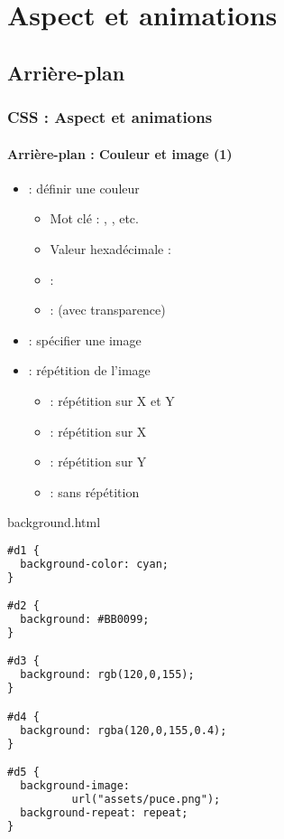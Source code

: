 \documentclass[xcolor=table]{beamer}
\begin{document}
\section{Aspect et animations}

\subsection{Arrière-plan}

\begin{frame}[fragile]
\frametitle{CSS : Aspect et animations}
\framesubtitle{Arrière-plan : Couleur et image (1)}

\begin{minipage}{0.60\textwidth}
	\begin{itemize}
		\item {} : définir une couleur
		\begin{itemize}
			\item Mot clé : , , etc.
			\item Valeur hexadécimale : 
			\item {} : 
			\item {} :  (avec transparence)
		\end{itemize}
		\item {} : spécifier une image
		\item {} : répétition de l'image
		\begin{itemize}
			\item {} : répétition sur X et Y
			\item {} : répétition sur X
			\item {} : répétition sur Y
			\item {} : sans répétition
		\end{itemize}
	\end{itemize}
\end{minipage}
%
\begin{minipage}{0.38\textwidth}
\begin{exampleblock}{background.html}
\lstset{escapeinside=**}
\tiny\bfseries\vspace{-6pt}
\begin{lstlisting}[language={html}]
#d1 {
  background-color: cyan;
}

#d2 {
  background: #BB0099;
}

#d3 {
  background: rgb(120,0,155);
}

#d4 {
  background: rgba(120,0,155,0.4);
}

#d5 {
  background-image: 
          url("assets/puce.png");
  background-repeat: repeat;
}
\end{lstlisting}\vspace{-6pt}
\end{exampleblock}
\end{minipage}
\end{frame}
\end{document}
